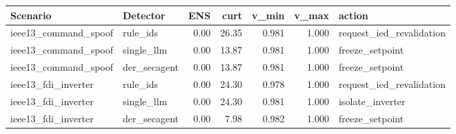 \begin{tabular}{llrrrrl}
\toprule
Scenario & Detector & ENS & curt & v\_min & v\_max & action \\
\midrule
ieee13\_command\_spoof & rule\_ids & 0.00 & 26.35 & 0.981 & 1.000 & request\_ied\_revalidation \\
ieee13\_command\_spoof & single\_llm & 0.00 & 13.87 & 0.981 & 1.000 & freeze\_setpoint \\
ieee13\_command\_spoof & der\_secagent & 0.00 & 13.87 & 0.981 & 1.000 & freeze\_setpoint \\
ieee13\_fdi\_inverter & rule\_ids & 0.00 & 24.30 & 0.978 & 1.000 & request\_ied\_revalidation \\
ieee13\_fdi\_inverter & single\_llm & 0.00 & 24.30 & 0.981 & 1.000 & isolate\_inverter \\
ieee13\_fdi\_inverter & der\_secagent & 0.00 & 7.98 & 0.982 & 1.000 & freeze\_setpoint \\
\bottomrule
\end{tabular}
